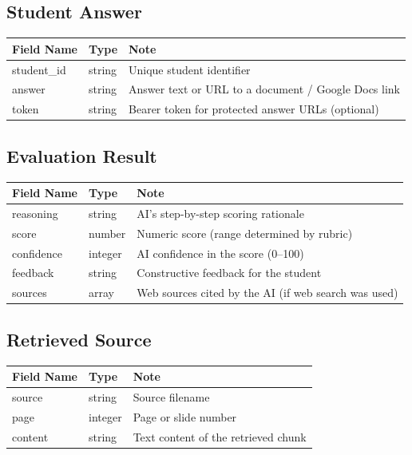 \documentclass[11pt]{article}
\begin{document}
\subsection{Student Answer}
\label{sec:studentanswer}

\begin{longtable}{|p{3.5cm}|p{2cm}|p{9.2cm}|}
  \hline
  \rowcolor{tabheader}
  \textbf{Field Name} & \textbf{Type} & \textbf{Note} \\
  \hline
  \endhead
  student\_id & string & Unique student identifier \\
  \hline
  answer      & string & Answer text or URL to a document / Google Docs link \\
  \hline
  token       & string & Bearer token for protected answer URLs (optional) \\
  \hline
\end{longtable}

\subsection{Evaluation Result}
\label{sec:evaluationresult}

\begin{longtable}{|p{3.5cm}|p{2cm}|p{9.2cm}|}
  \hline
  \rowcolor{tabheader}
  \textbf{Field Name} & \textbf{Type} & \textbf{Note} \\
  \hline
  \endhead
  reasoning  & string  & AI's step-by-step scoring rationale \\
  \hline
  score      & number  & Numeric score (range determined by rubric) \\
  \hline
  confidence & integer & AI confidence in the score (0--100) \\
  \hline
  feedback   & string  & Constructive feedback for the student \\
  \hline
  sources    & array   & Web sources cited by the AI (if web search was used) \\
  \hline
\end{longtable}

\subsection{Retrieved Source}
\label{sec:retrievedsource}

\begin{longtable}{|p{3.5cm}|p{2cm}|p{9.2cm}|}
  \hline
  \rowcolor{tabheader}
  \textbf{Field Name} & \textbf{Type} & \textbf{Note} \\
  \hline
  \endhead
  source  & string  & Source filename \\
  \hline
  page    & integer & Page or slide number \\
  \hline
  content & string  & Text content of the retrieved chunk \\
  \hline
\end{longtable}
\end{document}
